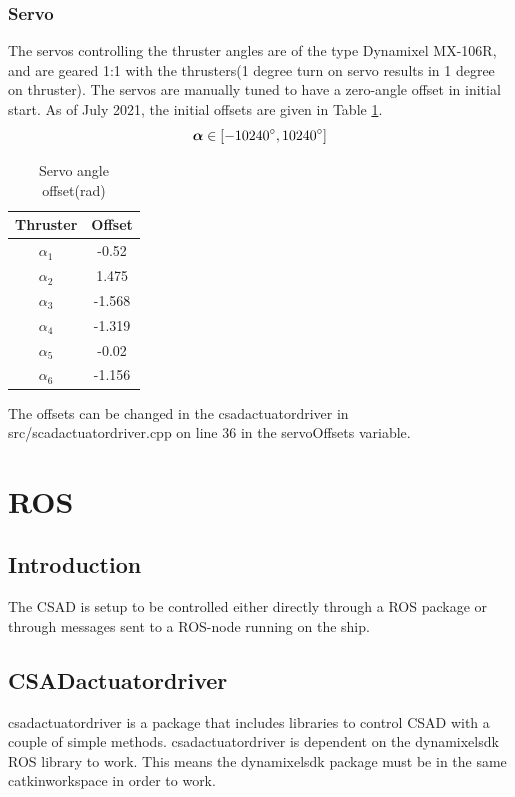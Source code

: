 \subsection{Servo}
The servos controlling the thruster angles are of the type Dynamixel MX-106R, and are geared 1:1 with the thrusters(1 degree turn on servo results in 1 degree on thruster). The servos are manually tuned to have a zero-angle offset in initial start. As of July 2021, the initial offsets are given in Table \ref{tab:angle_offset}.
\begin{equation}\label{eq:maxmin_angle}
	\bm{\alpha} \in [-10240\degree, 10240\degree]
\end{equation}
\begin{table}[htb!]
	\centering
	\caption{Servo angle offset(rad)}
	\begin{tabular}{cc}
		\hline
		\textbf{Thruster} & \textbf{Offset}\\ \hline
		$\alpha_1$ & -0.52\\
		$\alpha_2$ & 1.475\\
		$\alpha_3$ & -1.568\\
		$\alpha_4$ & -1.319\\
		$\alpha_5$ & -0.02\\
		$\alpha_6$ & -1.156\\
		\hline
	\end{tabular}
\label{tab:angle_offset}
\end{table}

The offsets can be changed in the csad\textunderscore actuator\textunderscore driver in src/scad\textunderscore actuator\textunderscore driver.cpp on line 36 in the servoOffsets variable.

\chapter{ROS}
\section{Introduction}
The CSAD is setup to be controlled either directly through a ROS package or through messages sent to a ROS-node running on the ship.

\section{CSAD\textunderscore actuator\textunderscore driver}
csad\textunderscore actuator\textunderscore driver is a package that includes libraries to control CSAD with a couple of simple methods.
csad\textunderscore actuator\textunderscore driver is dependent on the dynamixel\textunderscore sdk ROS library to work.
This means the dynamixel\textunderscore sdk package must be in the same catkin\textunderscore workspace in order to work.

